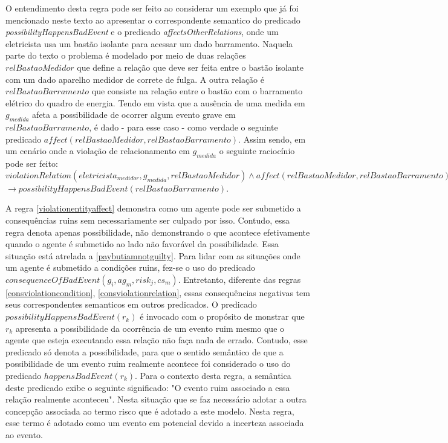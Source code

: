 O entendimento desta regra pode ser feito ao considerar um exemplo que já foi mencionado neste texto ao apresentar o correspondente semantico do predicado 
\textit{possibilityHappensBadEvent} e o predicado \textit{affectsOtherRelations}, onde um eletricista usa um bastão isolante para acessar um dado barramento. Naquela parte do texto 
o problema é modelado por meio de duas relações $relBastaoMedidor$ que define a relação que deve ser feita entre o bastão isolante com um dado aparelho 
medidor de correte de fulga. A outra relação é $relBastaoBarramento$ que consiste na relação entre o bastão com o barramento elétrico do quadro de energia. 
Tendo em vista que a ausência de uma medida em $g_{medida}$ afeta a possibilidade de ocorrer algum evento grave em $relBastaoBarramento$, 
é dado - para esse caso - como verdade o seguinte predicado $affect(relBastaoMedidor, relBastaoBarramento)$. Assim sendo, em um cenário onde a violação 
de relacionamento em $g_{medida}$ o seguinte raciocínio pode ser feito: 
$violationRelation(eletricista_{medidor},g_{medida},relBastaoMedidor) \wedge affect(relBastaoMedidor, relBastaoBarramento) $ \\ $\to  
possibilityHappensBadEvent(relBastaoBarramento)$.   

A regra \ref{violationentityaffect} demonstra como um agente pode ser submetido a consequências ruins sem necessariamente ser culpado por isso. Contudo, 
essa regra denota apenas possibilidade, não demonstrando o que acontece efetivamente quando o agente é submetido ao lado não favorável da possibilidade.
Essa situação está atrelada a \ref{paybutiamnotguilty}. Para lidar com as situações onde um agente é submetido a condições ruins, fez-se o uso do 
predicado $consequenceOfBadEvent(g_i,ag_m,risk_j,cs_m) $. Entretanto, diferente das regras \ref{consviolationcondition}, \ref{consviolationrelation}, 
essas consequências negativas tem seus correspondentes semanticos em outros predicados. O predicado $possibilityHappensBadEvent(r_k)$ é invocado com o propósito 
de monstrar que $r_k$ apresenta a possibilidade da ocorrência de um evento ruim mesmo que o agente que esteja executando essa relação não faça nada de errado. 
Contudo, esse predicado só denota a possibilidade, para que o sentido semântico de que a possibilidade de um evento ruim realmente acontece foi considerado 
o uso do predicado $happensBadEvent(r_k)$. Para o contexto desta regra, a semântica deste predicado exibe o seguinte significado: "O evento ruim associado 
a essa relação realmente aconteceu". Nesta situação que se faz necessário adotar a outra concepção associada ao termo risco que é adotado a este modelo.
Nesta regra, esse termo é adotado como um evento em potencial devido a incerteza associada ao evento. 

